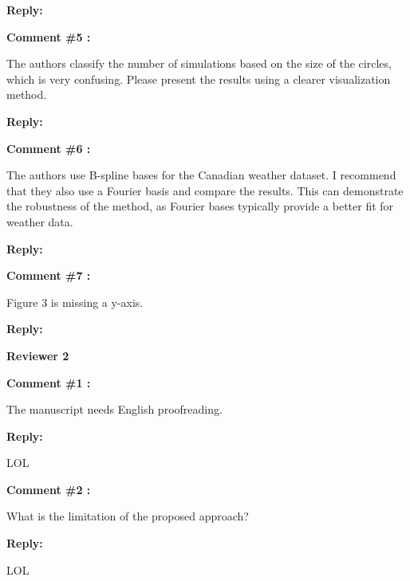 \documentclass[11pt]{article}
\begin{document}
\textbf{Reply:}



\bigskip

\itshape



\textbf{Comment \#5 :}

The authors classify the number of simulations based on the size of the circles, which is very confusing. Please present the results using a clearer visualization method.

\medskip

\normalfont

\textbf{Reply:}


\bigskip


\itshape

\textbf{Comment \#6 :}

The authors use B-spline bases for the Canadian weather dataset. I recommend that they also use a Fourier basis and compare the results. This can demonstrate the robustness of the method, as Fourier bases typically provide a better fit for weather data.


\medskip

\normalfont

\textbf{Reply:}



\bigskip


\itshape

\itshape

\textbf{Comment \#7 :}

Figure 3 is missing a y-axis.

\medskip

\normalfont

\textbf{Reply:}



\bigskip




{\large \textbf{Reviewer 2} }


\bigskip

\itshape


\textbf{Comment \#1 :}

The manuscript needs English proofreading.

\medskip

\normalfont

\textbf{Reply:} 

LOL

\bigskip


\textbf{Comment \#2 :}

What is the limitation of the proposed approach?

\medskip

\normalfont

\textbf{Reply:} 

LOL

\bigskip


%
% 
\end{document}
